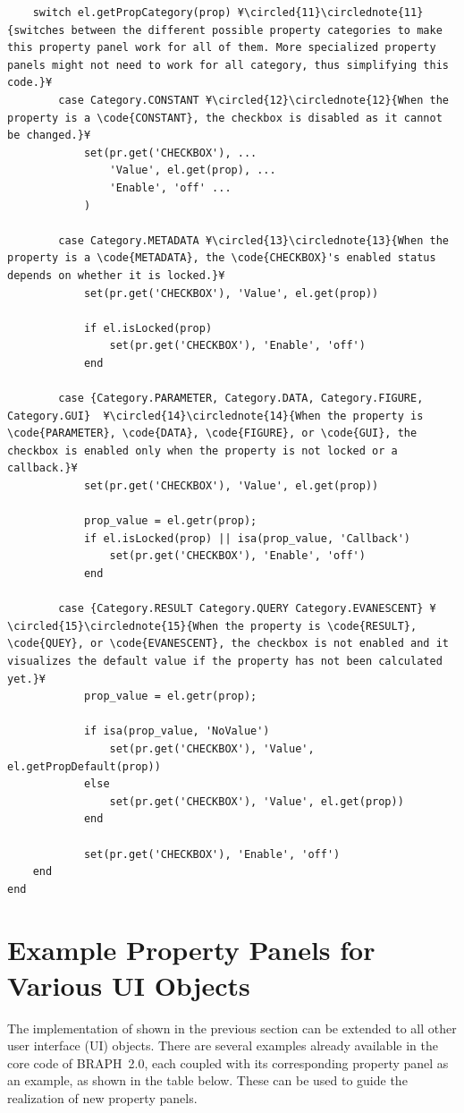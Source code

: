 \documentclass{tufte-handout}
\begin{document}
\begin{lstlisting}
	switch el.getPropCategory(prop) ¥\circled{11}\circlednote{11}{switches between the different possible property categories to make this property panel work for all of them. More specialized property panels might not need to work for all category, thus simplifying this code.}¥
		case Category.CONSTANT ¥\circled{12}\circlednote{12}{When the property is a \code{CONSTANT}, the checkbox is disabled as it cannot be changed.}¥
			set(pr.get('CHECKBOX'), ...
				'Value', el.get(prop), ...
				'Enable', 'off' ...
			)

		case Category.METADATA ¥\circled{13}\circlednote{13}{When the property is a \code{METADATA}, the \code{CHECKBOX}'s enabled status depends on whether it is locked.}¥
			set(pr.get('CHECKBOX'), 'Value', el.get(prop))

			if el.isLocked(prop)
				set(pr.get('CHECKBOX'), 'Enable', 'off')
			end

		case {Category.PARAMETER, Category.DATA, Category.FIGURE, Category.GUI}  ¥\circled{14}\circlednote{14}{When the property is \code{PARAMETER}, \code{DATA}, \code{FIGURE}, or \code{GUI}, the checkbox is enabled only when the property is not locked or a callback.}¥
			set(pr.get('CHECKBOX'), 'Value', el.get(prop))

			prop_value = el.getr(prop);
			if el.isLocked(prop) || isa(prop_value, 'Callback')
				set(pr.get('CHECKBOX'), 'Enable', 'off')
			end

		case {Category.RESULT Category.QUERY Category.EVANESCENT} ¥\circled{15}\circlednote{15}{When the property is \code{RESULT}, \code{QUEY}, or \code{EVANESCENT}, the checkbox is not enabled and it visualizes the default value if the property has not been calculated yet.}¥
			prop_value = el.getr(prop);

			if isa(prop_value, 'NoValue')
				set(pr.get('CHECKBOX'), 'Value', el.getPropDefault(prop))
			else
				set(pr.get('CHECKBOX'), 'Value', el.get(prop))
			end

			set(pr.get('CHECKBOX'), 'Enable', 'off')
	end
end
\end{lstlisting}

\clearpage

\section{Example Property Panels for Various UI Objects}

The implementation of  shown in the previous section can be extended to all other user interface (UI) objects. There are several examples already available in the core code of BRAPH~2.0, each coupled with its corresponding property panel as an example, as shown in the table below. These can be used to guide the realization of new property panels.
\end{document}
